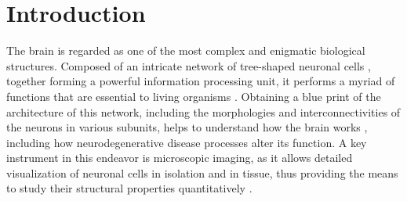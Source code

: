 \section{Introduction}
\label{sec:intro}
The brain is regarded as one of the most complex and enigmatic biological structures. Composed of an intricate network of tree-shaped neuronal cells \citep{ascoli2015trees}, together forming a powerful information processing unit, it performs a myriad of functions that are essential to living organisms \citep{kandel2000principles}. Obtaining a blue print of the architecture of this network, including the morphologies and interconnectivities of the neurons in various subunits, helps to understand how the brain works \citep{ascoli2002computational, donohue2008comparative, cuntz2010one}, including how  neurodegenerative disease processes alter its function. A key instrument in this endeavor is microscopic imaging, as it allows detailed visualization of neuronal cells in isolation and in tissue, thus providing the means to study their structural properties quantitatively \citep{senft2011brief}.